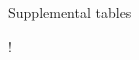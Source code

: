 
\ShowBackBib  %

\begin{Appendices}

\begin{Appendix}{Supplemental tables}
\end{Appendix}

\ShowListOfCode!
\end{Appendices}

\ShowIndex
